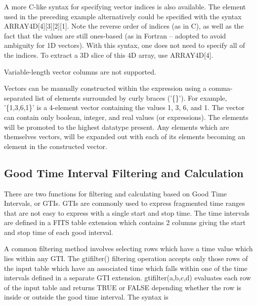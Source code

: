 \documentclass[11pt]{book}
\begin{document}
    A  more  C-like  syntax  for  specifying  vector  indices  is   also
    available.   The element used in the preceding example alternatively
    could be specified with the syntax  ARRAY4D[4][3][2][1].   Note  the
    reverse  order  of  indices  (as in C), as well as the fact that the
    values are still ones-based (as  in  Fortran  --  adopted  to  avoid
    ambiguity  for  1D vectors).  With this syntax, one does not need to
    specify all of the indices.  To  extract  a  3D  slice  of  this  4D
    array, use ARRAY4D[4].

    Variable-length vector columns are not supported.

    Vectors can  be manually constructed  within the expression  using a
    comma-separated list of  elements surrounded by curly braces ('\{\}').
    For example, '\{1,3,6,1\}' is a 4-element vector containing the values
    1, 3, 6, and 1.  The  vector can contain  only boolean, integer, and
    real values (or expressions).  The elements will  be promoted to the
    highest  datatype   present.  Any   elements   which  are themselves
    vectors, will be expanded out with  each of its elements becoming an
    element in the constructed vector.


\subsection{Good Time Interval Filtering and Calculation}

    There are two functions for filtering and calculating based
    on Good Time Intervals, or GTIs.  GTIs are commonly used to
    express fragmented time ranges that are not easy to express with a
    single start and stop time.  The time intervals are defined in a
    FITS table extension which contains 2 columns giving the
    start and stop time of each good interval.

    A common filtering method involves selecting rows which have a
    time value which lies within any GTI.  The gtifilter() filtering
    operation accepts only those rows of the input table which have an
    associated time which falls within one of the time intervals
    defined in a separate GTI extension.  gtifilter(a,b,c,d) evaluates
    each row of the input table and returns TRUE or FALSE depending
    whether the row is inside or outside the good time interval.  The
    syntax is
\end{document}
